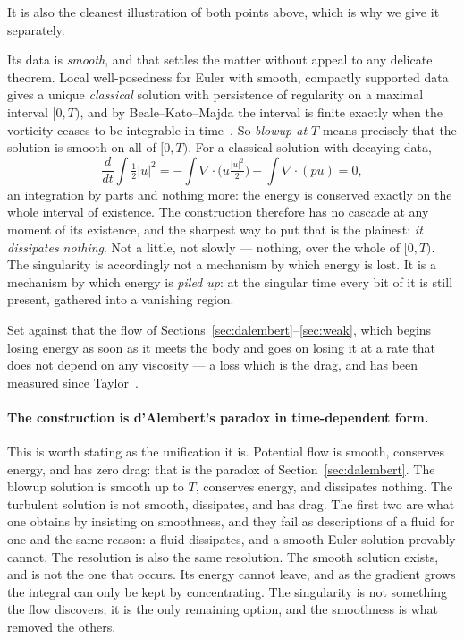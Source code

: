 \documentclass[11pt]{article}
\newcommand{\grad}{\nabla}
\begin{document}
It is also the cleanest illustration of both points above, which is why we give it separately.

Its data is \emph{smooth}, and that settles the matter without appeal to any delicate theorem. Local
well-posedness for Euler with smooth, compactly supported data gives a unique \emph{classical}
solution with persistence of regularity on a maximal interval $[0,T)$, and by Beale--Kato--Majda the
interval is finite exactly when the vorticity ceases to be integrable in time~\cite{bkm}. So
\emph{blowup at $T$} means precisely that the solution is smooth on all of $[0,T)$. For a classical
solution with decaying data,
\[
\frac{d}{dt}\int \tfrac12|u|^2
= -\int \grad\cdot\Big(u\tfrac{|u|^2}{2}\Big) - \int \grad\cdot(pu) = 0 ,
\]
an integration by parts and nothing more: the energy is conserved exactly on the whole interval of
existence. The construction therefore has no cascade at any moment of its existence, and the sharpest way to
put that is the plainest: \emph{it dissipates nothing}. Not a little, not slowly --- nothing, over
the whole of $[0,T)$. The singularity is accordingly not a mechanism by which energy is lost. It is
a mechanism by which energy is \emph{piled up}: at the singular time every bit of it is still
present, gathered into a vanishing region.

Set against that the flow of Sections~\ref{sec:dalembert}--\ref{sec:weak}, which begins losing
energy as soon as it meets the body and goes on losing it at a rate that does not depend on any
viscosity --- a loss which is the drag, and has been measured since Taylor~\cite{taylor}.

\paragraph{The construction is d'Alembert's paradox in time-dependent form.} This is worth stating
as the unification it is. Potential flow is smooth, conserves energy, and has zero drag: that is the
paradox of Section~\ref{sec:dalembert}. The blowup solution is smooth up to $T$, conserves energy,
and dissipates nothing. The turbulent solution is not smooth, dissipates, and has drag. The first
two are what one obtains by insisting on smoothness, and they fail as descriptions of a fluid for
one and the same reason: a fluid dissipates, and a smooth Euler solution provably cannot. The
resolution is also the same resolution. The smooth solution exists, and is not the one that occurs. Its energy cannot leave, and as the gradient
grows the integral can only be kept by concentrating. The singularity is not something the flow
discovers; it is the only remaining option, and the smoothness is what removed the others.
\end{document}
